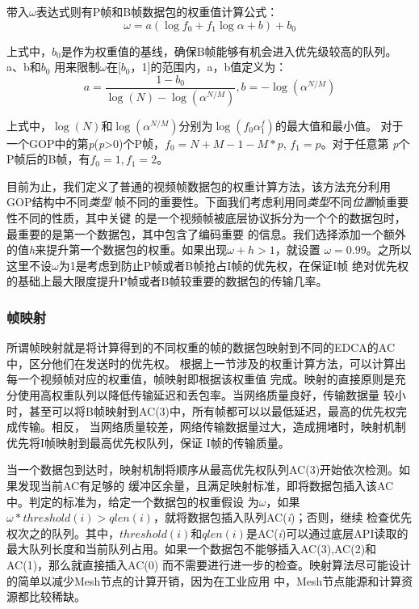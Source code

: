 带入$\omega$表达式则有P帧和B帧数据包的权重值计算公式：
\begin{equation}
\label{equ:omega}
\omega = a(\log f_{0} + f_{1}\log \alpha + b) + b_{0}
\end{equation}

上式中，$b_{0}$是作为权重值的基线，确保B帧能够有机会进入优先级较高的队列。a、b和$b_{0}$
用来限制$\omega$在[$b_{0}$，1]的范围内，a，b值定义为：
\begin{equation}
a = \frac{1-b_{0}}{\log(N) - \log(\alpha^{N/M})},
b = -\log(\alpha^{N/M})
\end{equation}

上式中，$\log(N)$和$\log(\alpha^{N/M})$分别为$\log(f_{0}\alpha^f_{1})$的最大值和最小值。
对于一个GOP中的第\emph{p}(\emph{p}>0)个P帧，$f_{0}=N+M-1-M*p$, $f_{1}=p$。对于任意第
\emph{p}个P帧后的B帧，有$f_{0}=1, f_{1}=2$。

目前为止，我们定义了普通的视频帧数据包的权重计算方法，该方法充分利用GOP结构中不同\emph{类型}
帧不同的重要性。下面我们考虑利用同\emph{类型}不同\emph{位置}帧重要性不同的性质，其中关键
的是一个视频帧被底层协议拆分为一个个的数据包时，最重要的是第一个数据包，其中包含了编码重要
的信息。我们选择添加一个额外的值\emph{h}来提升第一个数据包的权重。如果出现$\omega+h>1$，就设置
$\omega=0.99$。之所以这里不设$\omega$为1是考虑到防止P帧或者B帧抢占I帧的优先权，在保证I帧
绝对优先权的基础上最大限度提升P帧或者B帧较重要的数据包的传输几率。

\subsubsection{帧映射}
所谓帧映射就是将计算得到的不同权重的帧的数据包映射到不同的EDCA的AC中，区分他们在发送时的优先权。
根据上一节涉及的权重计算方法，可以计算出每一个视频帧对应的权重值，帧映射即根据该权重值
完成。映射的直接原则是充分使用高权重队列以降低传输延迟和丢包率。当网络质量良好，传输数据量
较小时，甚至可以将B帧映射到AC(3)中，所有帧都可以以最低延迟，最高的优先权完成传输。相反，
当网络质量较差，网络传输数据量过大，造成拥堵时，映射机制优先将I帧映射到最高优先权队列，保证
I帧的传输质量。

当一个数据包到达时，映射机制将顺序从最高优先权队列AC(3)开始依次检测。如果发现当前AC有足够的
缓冲区余量，且满足映射标准，即将数据包插入该AC中。判定的标准为，给定一个数据包的权重假设
为$\omega$，如果$\omega*threshold(i)>qlen(i)$，就将数据包插入队列AC(\emph{i})；否则，继续
检查优先权次之的队列。其中，$threshold(i)$和$qlen(i)$是AC(\emph{i})可以通过底层API读取的
最大队列长度和当前队列占用。如果一个数据包不能够插入AC(3),AC(2)和AC(1)，那么就直接插入AC(0)
而不需要进行进一步的检查。映射算法尽可能设计的简单以减少Mesh节点的计算开销，因为在工业应用
中，Mesh节点能源和计算资源都比较稀缺。

